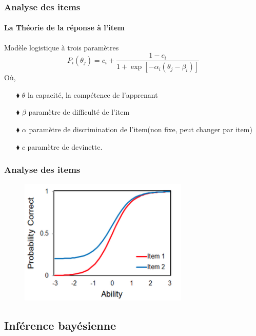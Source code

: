 \documentclass[aspectratio=169,professionalfonts, 12pt]{beamer}
\begin{document}
\begin{frame}
  \frametitle{Analyse des items}
  \framesubtitle{La Théorie de la réponse à l'item}
  \justifying
  \begin{minipage}{\textwidth}
  \begin{block}{Modèle logistique à trois paramètres}
    \begin{equation}
      P_{i}(\theta_{j}) = c_{i} +  \frac{1 - c_{i}}{1+ \exp \left[ -\alpha_{i}(\theta_{j}-\beta_{i}) \right]  } 
    \end{equation}
    Où, \\
    \begin{itemize}
      \item[$\blacklozenge$] \(\displaystyle \theta \) la capacité, la compétence de l'apprenant 
      \item[$\blacklozenge$] \(\displaystyle \beta \) paramètre de difficulté de l'item
      \item[$\blacklozenge$] \(\displaystyle \alpha \) paramètre de discrimination de l'item(non fixe, peut changer par item)
      \item[$\blacklozenge$] \(\displaystyle c \) paramètre de devinette.
    \end{itemize}
  \end{block}  
  \end{minipage} 
\end{frame}

\begin{frame}
  \frametitle{Analyse des items}
  \justifying 
  \begin{minipage}{\textwidth}
  \begin{figure}[H]
      \includegraphics[height=6cm]{images/etat_art/IRT3.png}
  \end{figure}
  \end{minipage}
\end{frame}


\subsection{Inférence bayésienne}
\end{document}

